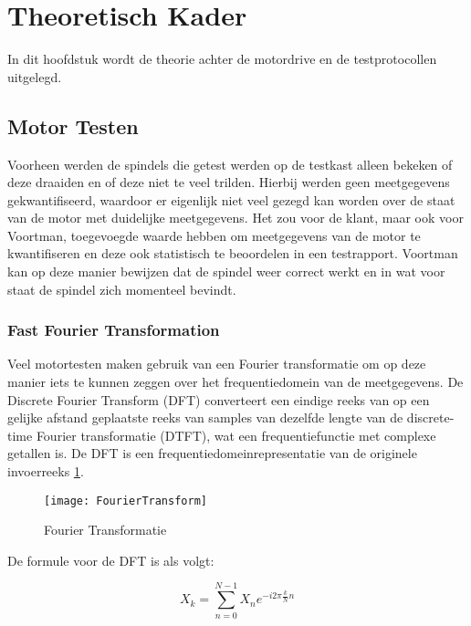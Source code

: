 \section{Theoretisch Kader} \label{sec:TheoretischKader}

In dit hoofdstuk wordt de theorie achter de motordrive en de testprotocollen uitgelegd.

\subsection{Motor Testen}

Voorheen werden de spindels die getest werden op de testkast alleen bekeken of deze draaiden en of deze niet te veel trilden. Hierbij werden geen meetgegevens gekwantifiseerd, waardoor er eigenlijk niet veel gezegd kan worden over de staat van de motor met duidelijke meetgegevens. Het zou voor de klant, maar ook voor Voortman, toegevoegde waarde hebben om meetgegevens van de motor te kwantifiseren en deze ook statistisch te beoordelen in een testrapport. Voortman kan op deze manier bewijzen dat de spindel weer correct werkt en in wat voor staat de spindel zich momenteel bevindt.

\subsubsection{Fast Fourier Transformation}

Veel motortesten maken gebruik van een Fourier transformatie om op deze manier iets te kunnen zeggen over het frequentiedomein van de meetgegevens. De Discrete Fourier Transform (\gls{DFT}) converteert een eindige reeks van op een gelijke afstand geplaatste reeks van samples van dezelfde lengte van de discrete-time Fourier transformatie (\gls{DTFT}), wat een frequentiefunctie met complexe getallen is. De DFT is een frequentiedomeinrepresentatie van de originele invoerreeks \ref{fig:FourierTransform}.

\begin{figure}[h]
	\centering
	\texttt{[image: FourierTransform]}
	\label{fig:FourierTransform}
	\caption{Fourier Transformatie}
\end{figure}

\newpage

De formule voor de \gls{DFT} is als volgt:

\begin{equation}
	X_k = \sum_{n=0}^{N-1}X_n e^{-i2\pi\frac{k}{N}n}
\end{equation}

